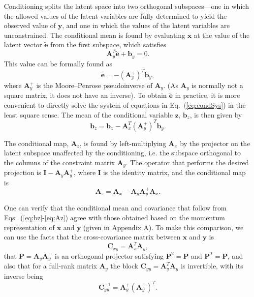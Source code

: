 \documentclass[a4paper,notitlepage]{article}
\renewcommand{\b}[1]{\mathbf{#1}}
\renewcommand{\eqref}[1]{Eq.~(\ref{#1})}
\begin{document}
Conditioning splits the latent space into two orthogonal subspaces---one in which the allowed values of the latent variables are fully determined to yield the observed value of $\b{y}$, and one in which the values of the latent variables are unconstrained. 
The conditional mean is found by evaluating $\b{x}$ at the value of the latent vector $\tilde{\b{e}}$ from the first subspace, which satisfies
\begin{equation}\label{eq:condSys}
\b{A}^T_y\tilde{\b{e}}+\b{b}_y=0.
\end{equation}
This value can be formally found as
\begin{equation}
\tilde{\b{e}}=-\left(\b{A}^{+}_y\right)^T\b{b}_y,
\end{equation}
where $\b{A}_{y}^{+}$ is the Moore–Penrose pseudoinverse of $\b{A}_{y}$. (As $\b{A}_{y}$ is normally not a square matrix, it does not have an inverse). To obtain $\tilde{\b{e}}$ in practice, it is more convenient to directly solve the system of equations in \eqref{eq:condSys} in the least square sense. The mean of the conditional variable $\b{z}$, $\b{b}_z$, is then given by
\begin{equation}\label{eq:bz}
\b{b}_z=\b{b}_x-\b{A}_x^T\left(\b{A}^{+}_y\right)^T \b{b}_y.
\end{equation}

The conditional map, $\b{A}_z$, is found by left-multiplying $\b{A}_x$ by the projector on the latent subspace unaffected by the conditioning, i.e. the subspace orthogonal to the columns of the constraint matrix $\b{A}_y$. The operator that performs the desired projection is $\b{I}-\b{A}_y\b{A}_y^{+}$, where $\b{I}$ is the identity matrix, and the conditional map is
\begin{equation}\label{eq:Az}
\b{A}_z=\b{A}_x-\b{A}_y\b{A}^{+}_y\b{A}_x.
\end{equation}

One can verify that the conditional mean and covariance that follow from Eqs.~(\ref{eq:bz}-\ref{eq:Az}) agree with those obtained based on the momentum representation of $\b{x}$ and $\b{y}$ (given in Appendix A). To make this comparison, we can use the facts that the cross-covariance matrix between $\b{x}$ and $\b{y}$ is
\begin{equation}
\b{C}_{xy}=\b{A}_{x}^T\b{A}_y,
\end{equation}
that $\b{P}=\b{A}_y\b{A}^{+}_y$ is an orthogonal projector satisfying $\b{P}^2=\b{P}$ and $\b{P}^T=\b{P}$, and also that for a full-rank matrix $\b{A}_y$ the block $\b{C}_{yy}=\b{A}^T_{y} \b{A}_{y}$ is invertible, with its inverse being
\begin{equation}
\b{C}_{yy}^{-1}=\b{A}^{+}_y\left(\b{A}^{+}_y\right)^T.
\end{equation}
\end{document}
